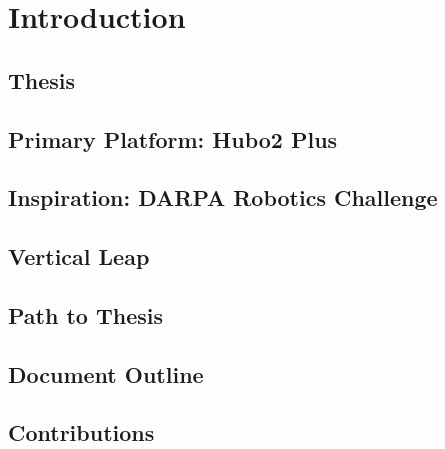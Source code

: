 \chapter{Introduction}
	\section{Thesis} %
		
	\section{Primary Platform: Hubo2 Plus}\label{sec:hubo}
			
	\section{Inspiration: DARPA Robotics Challenge}\label{sec:drc}
    		
    \section{Vertical Leap}
		
	\section{Path to Thesis}	
			
	\section{Document Outline} 
	
			
			
			
			
			
			
			
			
			
	\section{Contributions}\label{sec:contributions}
		
